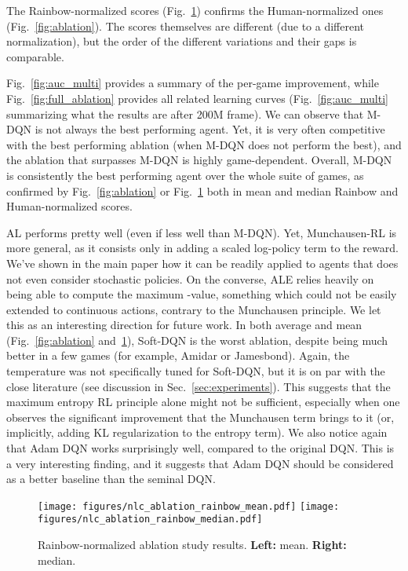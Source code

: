 \documentclass{article}
\begin{document}
The Rainbow-normalized scores (Fig.~\ref{fig:rainbow_ablation}) confirms the Human-normalized ones (Fig.~\ref{fig:ablation}). The scores themselves are different (due to a different normalization), but the order of the different variations and their gaps is comparable.

Fig.~\ref{fig:auc_multi} provides a summary of the per-game improvement, while Fig.~\ref{fig:full_ablation} provides all related learning curves (Fig.~\ref{fig:auc_multi} summarizing what the results are after 200M frame).
We can observe that M-DQN is not always the best performing agent. Yet, it is very often competitive with the best performing ablation (when M-DQN does not perform the best), and the ablation that surpasses M-DQN is highly game-dependent. Overall, M-DQN is consistently the best performing agent over the whole suite of games, as confirmed by Fig.~\ref{fig:ablation} or Fig.~\ref{fig:rainbow_ablation} both in mean and median Rainbow and Human-normalized scores.

AL performs pretty well (even if less well than M-DQN). Yet, Munchausen-RL is more general, as it consists only in adding a scaled log-policy term to the reward. We've shown in the main paper how it can be readily applied to agents that does not even consider stochastic policies. On the converse, ALE relies heavily on being able to compute the maximum -value, something which could not be easily extended to continuous actions, contrary to the Munchausen principle. We let this as an interesting direction for future work.
In both average and mean (Fig.~\ref{fig:ablation} and~\ref{fig:rainbow_ablation}), Soft-DQN is the worst ablation, despite being much better in a few games (for example, Amidar or Jamesbond). Again, the temperature was not specifically tuned for Soft-DQN, but it is on par with the close literature (see discussion in Sec.~\ref{sec:experiments}). This suggests that the maximum entropy RL principle alone might not be sufficient, especially when one observes the significant improvement that the Munchausen term brings to it (or, implicitly, adding KL regularization to the entropy term).
We also notice again that Adam DQN works surprisingly well, compared to the original DQN. This is a very interesting finding, and it suggests that Adam DQN should be considered as a better baseline than the seminal DQN.


\begin{figure}
    \centering
    \texttt{[image: figures/nlc\_ablation\_rainbow\_mean.pdf]}
    \texttt{[image: figures/nlc\_ablation\_rainbow\_median.pdf]}
    \caption{Rainbow-normalized ablation study results.  \textbf{Left:} mean. \textbf{Right:} median.}
    \label{fig:rainbow_ablation}
\end{figure}
\end{document}
